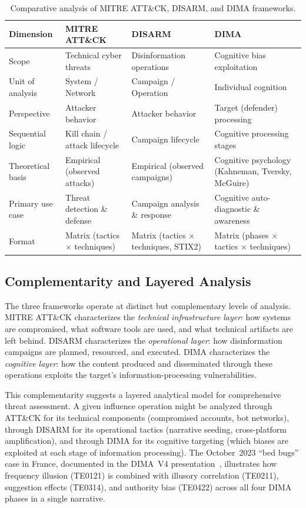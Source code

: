 \documentclass[11pt,a4paper]{article}
\begin{document}
\onecolumn
\begin{table}[htbp]
\centering
\caption{Comparative analysis of MITRE ATT\&CK, DISARM, and DIMA frameworks.}
\label{tab:comparison}
\small
\begin{tabular}{L{2.5cm}L{3.5cm}L{3.5cm}L{4.5cm}}
\toprule
\textbf{Dimension} & \textbf{MITRE ATT\&CK} & \textbf{DISARM} & \textbf{DIMA} \\
\midrule
Scope & Technical cyber threats & Disinformation operations & Cognitive bias exploitation \\
Unit of analysis & System / Network & Campaign / Operation & Individual cognition \\
Perspective & Attacker behavior & Attacker behavior & Target (defender) processing \\
Sequential logic & Kill chain / attack lifecycle & Campaign lifecycle & Cognitive processing stages \\
Theoretical basis & Empirical (observed attacks) & Empirical (observed campaigns) & Cognitive psychology (Kahneman, Tversky, McGuire) \\
Primary use case & Threat detection \& defense & Campaign analysis \& response & Cognitive auto-diagnostic \& awareness \\
Format & Matrix (tactics $\times$ techniques) & Matrix (tactics $\times$ techniques, STIX2) & Matrix (phases $\times$ tactics $\times$ techniques) \\
\bottomrule
\end{tabular}
\end{table}
\twocolumn

\subsection{Complementarity and Layered Analysis}

The three frameworks operate at distinct but complementary levels of analysis. MITRE ATT\&CK characterizes the \textit{technical infrastructure layer}: how systems are compromised, what software tools are used, and what technical artifacts are left behind. DISARM characterizes the \textit{operational layer}: how disinformation campaigns are planned, resourced, and executed. DIMA characterizes the \textit{cognitive layer}: how the content produced and disseminated through these operations exploits the target's information-processing vulnerabilities.

This complementarity suggests a layered analytical model for comprehensive threat assessment. A given influence operation might be analyzed through ATT\&CK for its technical components (compromised accounts, bot networks), through DISARM for its operational tactics (narrative seeding, cross-platform amplification), and through DIMA for its cognitive targeting (which biases are exploited at each stage of information processing). The October~2023 ``bed bugs'' case in France, documented in the DIMA~V4 presentation~\cite{boyer2024}, illustrates how frequency illusion (TE0121) is combined with illusory correlation (TE0211), suggestion effects (TE0314), and authority bias (TE0422) across all four DIMA phases in a single narrative.
\end{document}
